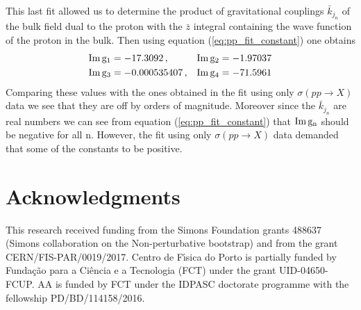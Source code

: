 \documentclass[preprint, 12pt]{elsarticle}
\begin{document}
This last fit allowed us to determine the product of gravitational couplings $\bar{k}_{j_n}$ of the bulk field dual to the proton with the $\bar{z}$ integral containing the wave function of the proton in the bulk. Then using equation (\ref{eq:pp_fit_constant}) one obtains
\begin{align}
& {\rm Im \, g_1} = -17.3092 \, , & {\rm Im \, g_2} = -1.97037 \notag \\
& {\rm Im \, g_3} = -0.000535407 \, , & {\rm Im \, g_4} =	-71.5961
\end{align}
Comparing these values with the ones obtained in the fit using only $\sigma\left(p p \rightarrow X\right)$ data we see that they are off by orders of magnitude. Moreover since the $\bar{k}_{j_n}$ are real numbers we can see from equation (\ref{eq:pp_fit_constant}) that ${\rm Im \, g_n}$ should be negative for all n. However, the fit using only $\sigma\left(p p \rightarrow X\right)$ data demanded that some of the constants to be positive.

\section{Acknowledgments}


This research received funding from the Simons Foundation grants 488637  (Simons collaboration on the Non-perturbative bootstrap)
and from the  grant CERN/FIS-PAR/0019/2017. 
Centro de F\'\i sica do Porto is partially funded by Funda\c c\~ao para a Ci\^encia e a Tecnologia (FCT) under the grant
UID-04650-FCUP.
 AA is funded by FCT under the IDPASC doctorate programme with the fellowship  PD/BD/114158/2016.



\end{document}
